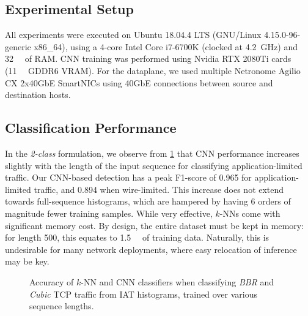 \subsection{Experimental Setup}
All experiments were executed on Ubuntu 18.04.4 LTS (GNU/Linux 4.15.0-96-generic x86\_64), using a 4-core Intel Core i7-6700K (clocked at \SI{4.2}{\giga\hertz}) and \SI{32}{\giga\byte} of RAM.
CNN training was performed using Nvidia RTX 2080Ti cards (\SI{11}{\giga\byte} GDDR6 VRAM).
For the dataplane, we used multiple Netronome Agilio CX 2x40GbE SmartNICs using 40GbE connections between source and destination hosts.


\subsection{Classification Performance}
In the \emph{2-class} formulation, we observe from \cref{fig:2c-results} that CNN performance increases slightly with the length of the input sequence for classifying application-limited traffic.
Our CNN-based detection has a peak F1-score of \num{0.965} for application-limited traffic, and \num{0.894} when wire-limited.
This increase does not extend towards full-sequence histograms, which are hampered by having 6 orders of magnitude fewer training samples.
While very effective, $k$-NNs come with significant memory cost.
By design, the entire dataset must be kept in memory: for length \num{500}, this equates to \SI{1.5}{\gibi\byte} of training data.
Naturally, this is undesirable for many network deployments, where easy relocation of inference may be key.

\begin{figure}
    \centering
    \caption{Accuracy of $k$-NN and CNN classifiers when classifying \emph{BBR} and \emph{Cubic} TCP traffic from IAT histograms, trained  over various sequence lengths.}
    \label{fig:2c-results}
\end{figure}

